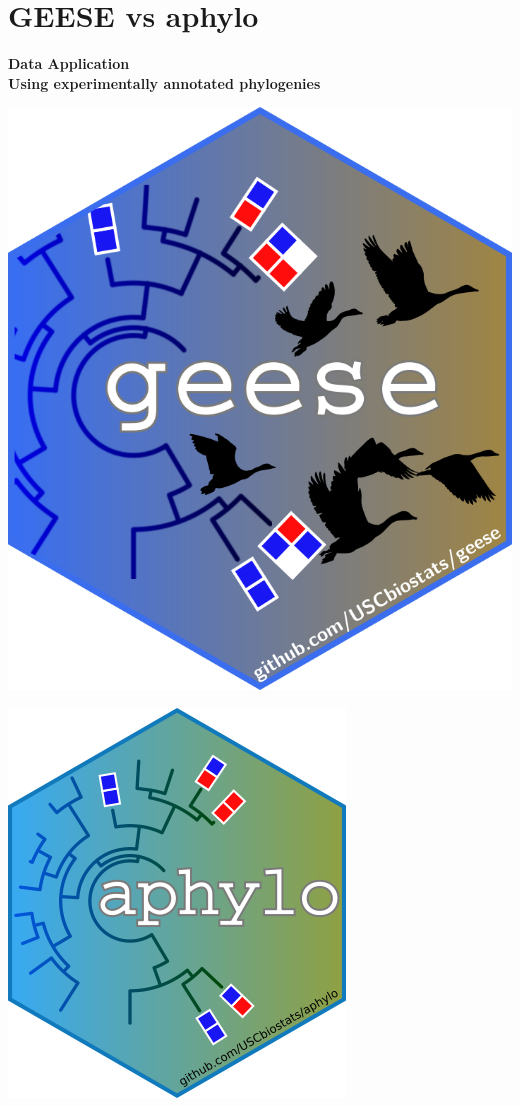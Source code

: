 \documentclass[aspectratio=169, 9pt]{beamer}
\begin{document}
\section{GEESE vs aphylo}

\begin{frame}[t]
	\textcolor{uscgold}{
		\Large {\bf Data Application} \\
		\normalsize{\bf Using experimentally annotated phylogenies} 
	}

\centering

\begin{minipage}[t]{.4\linewidth}
	\raggedleft
	\includegraphics[width=.6\linewidth]{geese-logo.png}
\end{minipage} 
\begin{minipage}[t]{.4\linewidth}
	\raggedright
	\includegraphics[width=.6\linewidth]{aphylo-logo.png}
\end{minipage} 

\end{frame}
\end{document}
